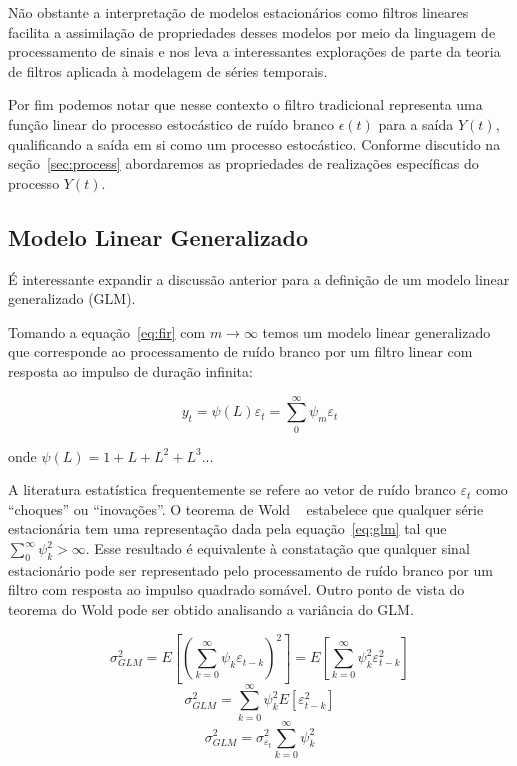 Não obstante a interpretação de modelos estacionários como filtros lineares
facilita a assimilação de propriedades desses modelos por meio da linguagem de
processamento de sinais e nos leva a interessantes explorações de parte da
teoria de filtros aplicada à modelagem de séries temporais.

Por fim podemos notar que nesse contexto o filtro tradicional representa uma
função linear do processo estocástico de ruído branco ${\epsilon(t)}$ para a
saída ${Y(t)}$, qualificando a saída em si como um processo estocástico.
Conforme discutido na seção~\ref{sec:process} abordaremos as propriedades de
realizações específicas do processo ${Y(t)}$.



\subsection{Modelo Linear Generalizado}
\label{sec:glm}

É interessante expandir a discussão anterior para a definição de um modelo
linear generalizado (GLM).

Tomando a equação~\ref{eq:fir} com $m \rightarrow \infty$ temos um modelo linear
generalizado que corresponde ao processamento de ruído branco por um filtro
linear com resposta ao impulso de duração infinita:

\begin{equation}\label{eq:glm}
    y_t = \psi(L)\varepsilon_t = \sum^{\infty}_{0} \psi_m \varepsilon_t
\end{equation}

onde $\psi(L) = 1 + L + L^2 + L^3 ...$

A literatura estatística frequentemente se refere ao vetor de ruído branco
$\varepsilon_t$ como ``choques'' ou ``inovações''. O teorema de Wold
~\cite{wold} estabelece que qualquer série estacionária tem uma representação
dada pela equação~\ref{eq:glm} tal que $\sum^{\infty}_{0} \psi_k^2 > \infty$. Esse
resultado é equivalente à constatação que qualquer sinal estacionário pode ser
representado pelo processamento de ruído branco por um filtro com resposta ao
impulso quadrado somável. Outro ponto de vista do teorema do Wold pode ser
obtido analisando a variância do GLM.

$$\sigma^2_{GLM} = E\left[\left(\sum^{\infty}_{k=0} \psi_k \varepsilon_{t-k}\right)^2\right] = E\left[\sum^{\infty}_{k=0} \psi_k^2 \varepsilon_{t-k}^2\right]$$
$$\sigma^2_{GLM} = \sum^{\infty}_{k=0} \psi_k^2 E[\varepsilon_{t-k}^2]$$
$$\sigma^2_{GLM} = \sigma^2_{\varepsilon_t} \sum^{\infty}_{k=0} \psi_k^2 $$


